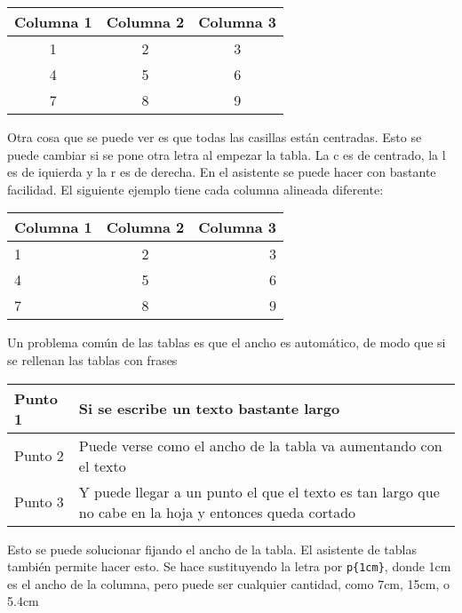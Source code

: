 \begin{center}
	\begin{tabular}{|c|c|c|}
	\hline 
	Columna 1 & Columna 2 & Columna 3 \\ 
	\hline 
	1 & 2 & 3 \\ 
	\hline 
	4 & 5 & 6 \\ 
	\hline 
	7 & 8 & 9 \\ 
	\hline 
\end{tabular} 
\end{center}

Otra cosa que se puede ver es que todas las casillas están centradas. Esto se puede cambiar si se pone otra letra al empezar la tabla. La c es de centrado, la l es de iquierda y la r es de derecha. En el asistente se puede hacer con bastante facilidad. El siguiente ejemplo tiene cada columna alineada diferente:

\begin{center}
	\begin{tabular}{|l|c|r|}
		\hline 
		Columna 1 & Columna 2 & Columna 3 \\ 
		\hline 
		1 & 2 & 3 \\ 
		\hline 
		4 & 5 & 6 \\ 
		\hline 
		7 & 8 & 9 \\ 
		\hline 
	\end{tabular} 
\end{center}

Un problema común de las tablas es que el ancho es automático, de modo que si se rellenan las tablas con frases

\begin{center}
	\begin{tabular}{|l|l|}
	\hline 
	Punto 1 & Si se escribe un texto bastante largo \\ 
	\hline 
	Punto 2 & Puede verse como el ancho de la tabla va aumentando con el texto \\ 
	\hline 
	Punto 3 & Y puede llegar a un punto el que el texto es tan largo que no cabe en la hoja y entonces queda cortado \\ 
	\hline 
\end{tabular} 
\end{center}

Esto se puede solucionar fijando el ancho de la tabla. El asistente de tablas también permite hacer esto. Se hace sustituyendo la letra por \verb!p{1cm}!, donde 1cm es el ancho de la columna, pero puede ser cualquier cantidad, como 7cm, 15cm, o 5.4cm

